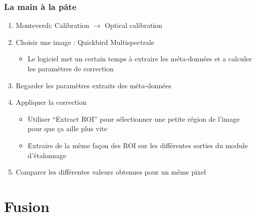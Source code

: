 \documentclass[compress,handout]{beamer}
\begin{document}
\begin{frame}
\frametitle{La main à la pâte}
\begin{enumerate}
\item Monteverdi: Calibration $\rightarrow$ Optical calibration
\item Choisir une image : Quickbird Multispectrale
  \begin{itemize}
  \item Le logiciel met un certain temps à extraire les méta-données
    et a calculer les paramètres de correction
  \end{itemize}
\item Regarder les paramètres extraits des méta-données
\item Appliquer la correction
  \begin{itemize}
  \item Utiliser ``Extract ROI'' pour sélectionner une petite région de
    l'image pour que ça aille plus vite
  \item Extraire de la même façon des ROI sur les différentes sorties
    du module d'étalonnage
  \end{itemize}
\item Comparer les différentes valeurs obtenues pour un même pixel
\end{enumerate}
\end{frame}

\section{Fusion}
\end{document}
